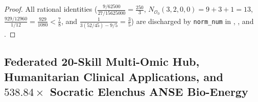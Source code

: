 \documentclass[11pt,a4paper]{article}
\theoremstyle{definition}
\begin{document}
\begin{proof}
All rational identities ($\frac{9/62500}{27/15625000} = \frac{250}{3}$, $N_{\mathcal{O}_0}(3,2,0,0) = 9 + 3 + 1 = 13$, $\frac{929/12960}{1/12} = \frac{929}{1080} < \frac{7}{8}$, and $\frac{1}{3(52/45) - 9/5} = \frac{3}{5}$) are discharged by \texttt{norm\_num} in , , and .
\end{proof}

\subsection{Federated 20-Skill Multi-Omic Hub, Humanitarian Clinical Applications, and $538.84\times$ Socratic Elenchus ANSE Bio-Energy}
\end{document}
